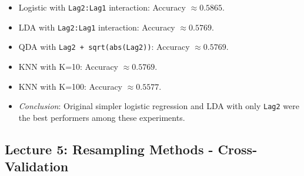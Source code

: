 \documentclass[12pt,a4paper]{article}
\newcommand{\Rcode}[1]{\texttt{#1}} %
\begin{document}
\begin{itemize}
\begin{itemize}
\begin{itemize}
                    \item Logistic with \Rcode{Lag2:Lag1} interaction: Accuracy $\approx 0.5865$.
                    \item LDA with \Rcode{Lag2:Lag1} interaction: Accuracy $\approx 0.5769$.
                    \item QDA with \Rcode{Lag2 + sqrt(abs(Lag2))}: Accuracy $\approx 0.5769$.
                    \item KNN with K=10: Accuracy $\approx 0.5769$.
                    \item KNN with K=100: Accuracy $\approx 0.5577$.
                    \item \textit{Conclusion}: Original simpler logistic regression and LDA with only \Rcode{Lag2} were the best performers among these experiments.
                \end{itemize}
        \end{itemize}
\subsection{Lecture 5: Resampling Methods - Cross-Validation }

\end{itemize}
\end{document}
